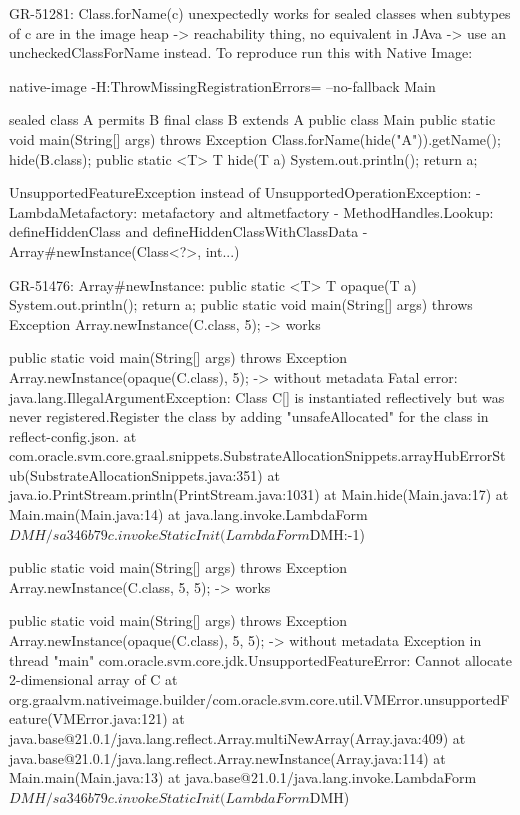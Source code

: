 GR-51281: Class.forName(c) unexpectedly works for sealed classes when subtypes of c are in the image heap
-> reachability thing, no equivalent in JAva -> use an uncheckedClassForName instead.
To reproduce run this with Native Image:

native-image -H:ThrowMissingRegistrationErrors= --no-fallback Main

sealed class A permits B {}
final class B extends A {}
public class Main {
    public static void main(String[] args) throws Exception {
        Class.forName(hide("A")).getName();
        hide(B.class);
    }
    public static <T> T hide(T a) {
        System.out.println();
        return a;
    }
}


UnsupportedFeatureException instead of UnsupportedOperationException:
- LambdaMetafactory: metafactory and altmetfactory
- MethodHandles.Lookup: defineHiddenClass and defineHiddenClassWithClassData
- Array#newInstance(Class<?>, int...)

GR-51476: Array#newInstance:
    public static <T> T opaque(T a) {
        System.out.println();
        return a;
    }
    public static void main(String[] args) throws Exception {
        Array.newInstance(C.class, 5);
    }
    -> works

    public static void main(String[] args) throws Exception {
        Array.newInstance(opaque(C.class), 5);
    }
    -> without metadata
    Fatal error: java.lang.IllegalArgumentException: Class C[] is instantiated reflectively but was never registered.Register the class by adding "unsafeAllocated" for the class in reflect-config.json.
    at com.oracle.svm.core.graal.snippets.SubstrateAllocationSnippets.arrayHubErrorStub(SubstrateAllocationSnippets.java:351)
    at java.io.PrintStream.println(PrintStream.java:1031)
    at Main.hide(Main.java:17)
    at Main.main(Main.java:14)
    at java.lang.invoke.LambdaForm$DMH/sa346b79c.invokeStaticInit(LambdaForm$DMH:-1)

    public static void main(String[] args) throws Exception {
        Array.newInstance(C.class, 5, 5);
    }
    -> works

    public static void main(String[] args) throws Exception {
        Array.newInstance(opaque(C.class), 5, 5);
    }
    -> without metadata
    Exception in thread "main" com.oracle.svm.core.jdk.UnsupportedFeatureError: Cannot allocate 2-dimensional array of C
        at org.graalvm.nativeimage.builder/com.oracle.svm.core.util.VMError.unsupportedFeature(VMError.java:121)
        at java.base@21.0.1/java.lang.reflect.Array.multiNewArray(Array.java:409)
        at java.base@21.0.1/java.lang.reflect.Array.newInstance(Array.java:114)
        at Main.main(Main.java:13)
        at java.base@21.0.1/java.lang.invoke.LambdaForm$DMH/sa346b79c.invokeStaticInit(LambdaForm$DMH)


